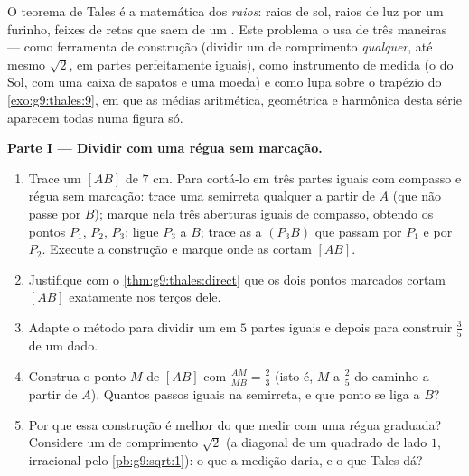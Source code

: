 \begin{problem}
\label{pb:g9:thales:1}
O teorema de Tales é a matemática dos \emph{raios}: raios de sol, raios
de luz por um furinho, feixes de retas que saem de um . Este
problema o usa de três maneiras --- como ferramenta de construção
(dividir um  de comprimento \emph{qualquer}, até mesmo
$\sqrt2$, em partes perfeitamente iguais), como instrumento de medida
(o  do Sol, com uma caixa de sapatos e uma moeda) e como lupa
sobre o trapézio do \cref{exo:g9:thales:9}, em que as médias
aritmética, geométrica e harmônica desta série aparecem todas numa
figura só.

\medskip
\noindent\textbf{Parte I --- Dividir com uma régua sem marcação.}
\begin{enumerate}
  \item Trace um  $[AB]$ de $7$ cm. Para cortá-lo em três
        partes iguais com compasso e régua sem marcação: trace uma
        semirreta qualquer a partir de $A$ (que não passe por $B$);
        marque nela três aberturas iguais de compasso, obtendo os
        pontos $P_1$, $P_2$, $P_3$; ligue $P_3$ a $B$; trace as
         a $(P_3 B)$ que passam por $P_1$ e por $P_2$. Execute
        a construção e marque onde as  cortam $[AB]$.
  \item Justifique com o \cref{thm:g9:thales:direct} que os dois pontos
        marcados cortam $[AB]$ exatamente nos terços dele.
  \item Adapte o método para dividir um  em $5$ partes iguais e
        depois para construir $\frac35$ de um  dado.
  \item Construa o ponto $M$ de $[AB]$ com $\frac{AM}{MB} = \frac23$
        (isto é, $M$ a $\frac25$ do caminho a partir de $A$). Quantos
        passos iguais na semirreta, e que ponto se liga a $B$?
  \item Por que essa construção é melhor do que medir com uma régua
        graduada? Considere um  de comprimento $\sqrt2$ (a
        diagonal de um quadrado de lado $1$, irracional pelo
        \cref{pb:g9:sqrt:1}): o que a medição daria, e o que Tales dá?
\end{enumerate}


\end{problem}
